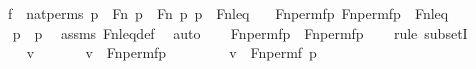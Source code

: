 \begin{isabellebody}
\ \ \ {\isachardoublequoteopen}f\ {\isasymin}\ nat{\isacharunderscore}{\kern0pt}perms{\isachardoublequoteclose}\ {\isachardoublequoteopen}p\ {\isasymin}\ Fn{\isachardoublequoteclose}\ {\isachardoublequoteopen}p{\isacharprime}{\kern0pt}\ {\isasymin}\ Fn{\isachardoublequoteclose}\ {\isachardoublequoteopen}{\isacharless}{\kern0pt}p{\isacharcomma}{\kern0pt}\ p{\isacharprime}{\kern0pt}{\isachargreater}{\kern0pt}\ {\isasymin}\ Fn{\isacharunderscore}{\kern0pt}leq{\isachardoublequoteclose}\isanewline
\ \ \ {\isachardoublequoteopen}{\isacharless}{\kern0pt}Fn{\isacharunderscore}{\kern0pt}perm{\isacharprime}{\kern0pt}{\isacharparenleft}{\kern0pt}f{\isacharparenright}{\kern0pt}{\isacharbackquote}{\kern0pt}p{\isacharcomma}{\kern0pt}\ Fn{\isacharunderscore}{\kern0pt}perm{\isacharprime}{\kern0pt}{\isacharparenleft}{\kern0pt}f{\isacharparenright}{\kern0pt}{\isacharbackquote}{\kern0pt}p{\isacharprime}{\kern0pt}{\isachargreater}{\kern0pt}\ {\isasymin}\ Fn{\isacharunderscore}{\kern0pt}leq{\isachardoublequoteclose}\ \isanewline
%
\isadelimproof
%
\endisadelimproof
%
\isatagproof
{}\isamarkupfalse%
\ {\isacharminus}{\kern0pt}\ \isanewline
\ \ \isamarkupfalse%
\ {\isachardoublequoteopen}p{\isacharprime}{\kern0pt}\ {\isasymsubseteq}\ p{\isachardoublequoteclose}\ \isamarkupfalse%
\ assms\ Fn{\isacharunderscore}{\kern0pt}leq{\isacharunderscore}{\kern0pt}def\ \isamarkupfalse%
\ auto\isanewline
\isanewline
\ \ \isamarkupfalse%
\ {\isachardoublequoteopen}Fn{\isacharunderscore}{\kern0pt}perm{\isacharprime}{\kern0pt}{\isacharparenleft}{\kern0pt}f{\isacharparenright}{\kern0pt}{\isacharbackquote}{\kern0pt}p{\isacharprime}{\kern0pt}\ {\isasymsubseteq}\ Fn{\isacharunderscore}{\kern0pt}perm{\isacharprime}{\kern0pt}{\isacharparenleft}{\kern0pt}f{\isacharparenright}{\kern0pt}{\isacharbackquote}{\kern0pt}p{\isachardoublequoteclose}\ \isanewline
\ \ \isamarkupfalse%
{\isacharparenleft}{\kern0pt}rule\ subsetI{\isacharparenright}{\kern0pt}\isanewline
\ \ \ \ \isamarkupfalse%
\ v\ \isanewline
\ \ \ \ \isamarkupfalse%
\ {\isachardoublequoteopen}v\ {\isasymin}\ Fn{\isacharunderscore}{\kern0pt}perm{\isacharprime}{\kern0pt}{\isacharparenleft}{\kern0pt}f{\isacharparenright}{\kern0pt}{\isacharbackquote}{\kern0pt}p{\isacharprime}{\kern0pt}{\isachardoublequoteclose}\ \isanewline
\ \ \ \ \isamarkupfalse%
\ \isamarkupfalse%
\ {\isachardoublequoteopen}v\ {\isasymin}\ Fn{\isacharunderscore}{\kern0pt}perm{\isacharparenleft}{\kern0pt}f{\isacharcomma}{\kern0pt}\ p{\isacharprime}{\kern0pt}{\isacharparenright}{\kern0pt}{\isachardoublequoteclose}\ \isamarkupfalse%

\end{isabellebody}
